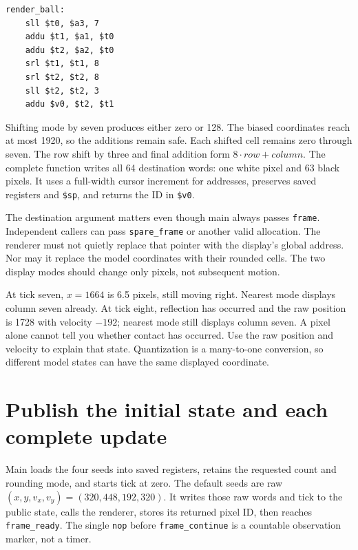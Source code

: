 \noindent\begin{minipage}{\linewidth}
  \begin{verbatim}
render_ball:
    sll $t0, $a3, 7
    addu $t1, $a1, $t0
    addu $t2, $a2, $t0
    srl $t1, $t1, 8
    srl $t2, $t2, 8
    sll $t2, $t2, 3
    addu $v0, $t2, $t1
\end{verbatim}
\end{minipage}

Shifting mode by seven produces either zero or 128. The biased coordinates reach
at most 1920, so the additions remain safe. Each shifted cell remains zero through
seven. The row shift by three and final addition form $8\cdot row+column$.
The complete function writes all 64 destination words: one white pixel and 63
black pixels. It uses a full-width cursor increment for addresses, preserves saved
registers and \texttt{\$sp}, and returns the ID in \texttt{\$v0}.

The destination argument matters even though main always passes \texttt{frame}.
Independent callers can pass \texttt{spare\_frame} or another valid allocation.
The renderer must not quietly replace that pointer with the display's global address.
Nor may it replace the model coordinates with their rounded cells. The two display
modes should change only pixels, not subsequent motion.



At tick seven, $x=1664$ is 6.5 pixels, still moving right. Nearest mode displays
column seven already. At tick eight, reflection has occurred and the raw position
is 1728 with velocity $-192$; nearest mode still displays column seven. A pixel
alone cannot tell you whether contact has occurred. Use the raw position and
velocity to explain that state. Quantization is a many-to-one conversion, so
different model states can have the same displayed coordinate.

\section{Publish the initial state and each complete update}

Main loads the four seeds into saved registers, retains the requested count and
rounding mode, and starts tick at zero. The default seeds are raw
$(x,y,v_x,v_y)=(320,448,192,320)$. It writes those raw words and tick to the public
state, calls the renderer, stores its returned pixel ID, then reaches
\texttt{frame\_ready}. The single \texttt{nop} before \texttt{frame\_continue}
is a countable observation marker, not a timer.

